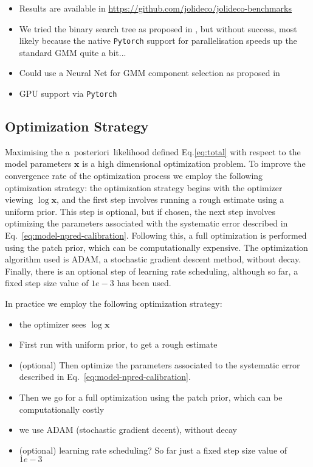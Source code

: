 \documentclass[twocolumn]{aastex631}
\newcommand{\aposteriori}{a~posteriori~}
\begin{document}
    \begin{itemize}
        \item Results are available in \url{https://github.com/jolideco/jolideco-benchmarks}
        \item We tried the binary search tree as proposed in \cite{Parameswaran2018},
        but without success, most likely because the native \texttt{Pytorch} support
        for parallelisation speeds up the standard GMM quite a bit...
        \item Could use a Neural Net for GMM component selection as proposed in \cite{Rosenbaum15}
        \item GPU support via \texttt{Pytorch}

    \end{itemize}

    \subsection{Optimization Strategy}
    Maximising the \aposteriori likelihood defined Eq.\ref{eq:total} with respect to the model parameters $\mathbf{x}$ is a high dimensional optimization problem. To improve the convergence rate of the optimization process we employ the following optimization strategy: the optimization strategy begins with the optimizer viewing $\log{\mathbf{x}}$, and the first step involves running a rough estimate using a uniform prior. This step is optional, but if chosen, the next step involves optimizing the parameters associated with the systematic error described in Eq.~\ref{eq:model-npred-calibration}. Following this, a full optimization is performed using the patch prior, which can be computationally expensive. The optimization algorithm used is ADAM, a stochastic gradient descent method, without decay. Finally, there is an optional step of learning rate scheduling, although so far, a fixed step size value of $1e-3$ has been used.
    
    In practice we employ the following optimization strategy:
    \begin{itemize}
        \item the optimizer sees $\log{\mathbf{x}}$
        \item First run with uniform prior, to get a rough estimate
        \item (optional) Then optimize the parameters associated to the systematic error described in Eq.~\ref{eq:model-npred-calibration}.
        \item Then we go for a full optimization using the patch prior, which can be computationally costly
        \item we use ADAM (stochastic gradient decent), without decay
        \item  (optional) learning rate scheduling? So far just a fixed step size value of $1e-3$
    \end{itemize}
    
\end{document}
